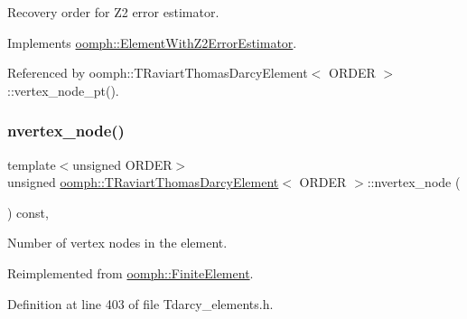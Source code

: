 Recovery order for Z2 error estimator. 



Implements \hyperlink{classoomph_1_1ElementWithZ2ErrorEstimator_af39480835bd3e0f6b2f4f7a9a4044798}{oomph\+::\+Element\+With\+Z2\+Error\+Estimator}.



Referenced by oomph\+::\+T\+Raviart\+Thomas\+Darcy\+Element$<$ O\+R\+D\+E\+R $>$\+::vertex\+\_\+node\+\_\+pt().

\mbox{\label{classoomph_1_1TRaviartThomasDarcyElement_a37259bdb01f2dc45d6bf26976e6e1cfd}} 
\subsubsection{\texorpdfstring{nvertex\+\_\+node()}{nvertex\_node()}}
{\footnotesize\ttfamily template$<$unsigned O\+R\+D\+ER$>$ \\
unsigned \hyperlink{classoomph_1_1TRaviartThomasDarcyElement}{oomph\+::\+T\+Raviart\+Thomas\+Darcy\+Element}$<$ O\+R\+D\+ER $>$\+::nvertex\+\_\+node (\begin{DoxyParamCaption}{ }\end{DoxyParamCaption}) const\hspace{0.3cm}{\ttfamily [inline]}, {\ttfamily [virtual]}}



Number of vertex nodes in the element. 



Reimplemented from \hyperlink{classoomph_1_1FiniteElement_a45631a7aa50efc3123a921d114f84cba}{oomph\+::\+Finite\+Element}.



Definition at line 403 of file Tdarcy\+\_\+elements.\+h.

\mbox{\label{classoomph_1_1TRaviartThomasDarcyElement_a5ef511a62668baf093c5531be1e086d7}} 
